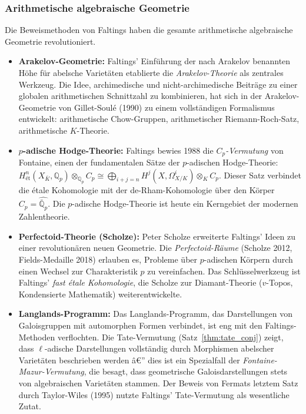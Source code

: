 ﻿\documentclass[12pt,a4paper]{article}
\theoremstyle{plain}
\theoremstyle{definition}
\theoremstyle{remark}
\newcommand{\Q}{\mathbb{Q}}
\begin{document}
\subsubsection{Arithmetische algebraische Geometrie}

Die Beweismethoden von Faltings haben die gesamte arithmetische algebraische Geometrie
revolutioniert.

\begin{itemize}[leftmargin=2em,itemsep=4pt]
  \item \textbf{Arakelov-Geometrie:}
    Faltings' Einführung der nach Arakelov benannten Höhe für abelsche Varietäten
    etablierte die \emph{Arakelov-Theorie} als zentrales Werkzeug. Die Idee,
    archimedische und nicht-archimedische Beiträge zu einer globalen arithmetischen
    Schnittzahl zu kombinieren, hat sich in der Arakelov-Geometrie von Gillet-Soulé (1990)
    zu einem vollständigen Formalismus entwickelt: arithmetische Chow-Gruppen,
    arithmetischer Riemann-Roch-Satz, arithmetische $K$-Theorie.

  \item \textbf{$p$-adische Hodge-Theorie:}
    Faltings bewies 1988 die \emph{$C_p$-Vermutung} von Fontaine, einen der
    fundamentalen Sätze der $p$-adischen Hodge-Theorie:
    $H^n_{\text{ét}}(X_{\bar K}, \Q_p) \otimes_{\Q_p} C_p \cong
    \bigoplus_{i+j=n} H^j(X, \Omega^i_{X/K}) \otimes_K C_p$.
    Dieser Satz verbindet die étale Kohomologie mit der de-Rham-Kohomologie
    über den Körper $C_p = \widehat{\bar{\Q}_p}$. Die $p$-adische Hodge-Theorie
    ist heute ein Kerngebiet der modernen Zahlentheorie.

  \item \textbf{Perfectoid-Theorie (Scholze):}
    Peter Scholze erweiterte Faltings' Ideen zu einer revolutionären neuen Geometrie.
    Die \emph{Perfectoid-Räume} (Scholze 2012, Fields-Medaille 2018) erlauben es,
    Probleme über $p$-adischen Körpern durch einen Wechsel zur Charakteristik $p$
    zu vereinfachen. Das Schlüsselwerkzeug ist Faltings' \emph{fast étale Kohomologie},
    die Scholze zur Diamant-Theorie ($v$-Topos, Kondensierte Mathematik) weiterentwickelte.

  \item \textbf{Langlands-Programm:}
    Das Langlands-Programm, das Darstellungen von Galoisgruppen mit automorphen Formen
    verbindet, ist eng mit den Faltings-Methoden verflochten.
    Die Tate-Vermutung (Satz~\ref{thm:tate_conj}) zeigt, dass $\ell$-adische Darstellungen
    vollständig durch Morphismen abelscher Varietäten beschrieben werden â€”
    dies ist ein Spezialfall der \emph{Fontaine-Mazur-Vermutung}, die besagt,
    dass geometrische Galoisdarstellungen stets von algebraischen Varietäten stammen.
    Der Beweis von Fermats letztem Satz durch Taylor-Wiles (1995) nutzte Faltings'
    Tate-Vermutung als wesentliche Zutat.


\end{itemize}
\end{document}
